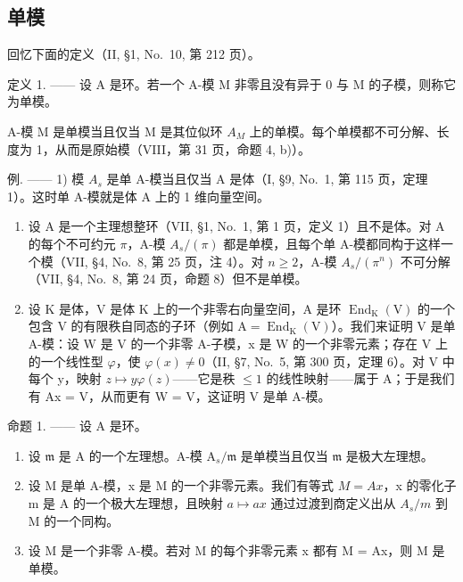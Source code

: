 \subsection{单模}

回忆下面的定义（II, §1, No.~10, 第 212 页）。

定义 1. —— 设 A 是环。若一个 A-模 M 非零且没有异于 0 与 M 的子模，则称它为单模。

A-模 M 是单模当且仅当 M 是其位似环 \(A_{M}\) 上的单模。每个单模都不可分解、长度为 1，从而是原始模（VIII，第 31 页，命题 4, b)）。

例. —— 1) 模 \(A_{s}\) 是单 A-模当且仅当 A 是体（I, §9, No.~1, 第 115 页，定理 1）。这时单 A-模就是体 A 上的 1 维向量空间。

\begin{enumerate}
\def\labelenumi{\arabic{enumi})}
\setcounter{enumi}{1}
\item
  设 A 是一个主理想整环（VII, §1, No.~1, 第 1 页，定义 1）且不是体。对 A 的每个不可约元 \(\pi\)，A-模 \(A_s / (\pi)\) 都是单模，且每个单 A-模都同构于这样一个模（VII, §4, No.~8, 第 25 页，注 4）。对 \(n \geqslant 2\)，A-模 \(A_s / (\pi^n)\) 不可分解（VII, §4, No.~8, 第 24 页，命题 8）但不是单模。
\item
  设 K 是体，V 是体 K 上的一个非零右向量空间，A 是环 \(\operatorname{End}_{\mathrm{K}}(\mathrm{V})\) 的一个包含 V 的有限秩自同态的子环（例如 \(\mathrm{A} = \operatorname{End}_{\mathrm{K}}(\mathrm{V})\)）。我们来证明 V 是单 A-模：设 W 是 V 的一个非零 A-子模，x 是 W 的一个非零元素；存在 V 上的一个线性型 \(\varphi\)，使 \(\varphi(x) \neq 0\)（II, §7, No.~5, 第 300 页，定理 6）。对 V 中每个 y，映射 \(z \mapsto y\varphi(z)\)——它是秩 \(\leqslant 1\) 的线性映射——属于 A；于是我们有 Ax = V，从而更有 W = V，这证明 V 是单 A-模。
\end{enumerate}

命题 1. —— 设 A 是环。

\begin{enumerate}
\def\labelenumi{\alph{enumi})}
\item
  设 \(\mathfrak{m}\) 是 A 的一个左理想。A-模 \(\mathrm{A}_s / \mathfrak{m}\) 是单模当且仅当 \(\mathfrak{m}\) 是极大左理想。
\item
  设 M 是单 A-模，x 是 M 的一个非零元素。我们有等式 \(M = Ax\)，x 的零化子 m 是 A 的一个极大左理想，且映射 \(a \mapsto ax\) 通过过渡到商定义出从 \(A_{s}/m\) 到 M 的一个同构。
\item
  设 M 是一个非零 A-模。若对 M 的每个非零元素 x 都有 M = Ax，则 M 是单模。
\end{enumerate}


